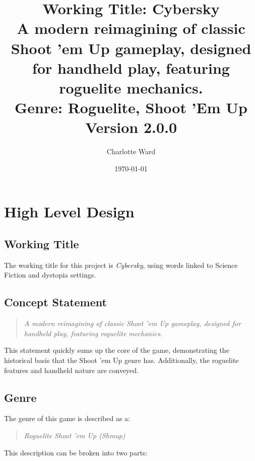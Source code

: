 \documentclass{scrartcl}
\begin{document}
\author{Charlotte Ward}
\date{\today}
\title{
{\huge Working Title: Cybersky} \\
{\small A modern reimagining of classic Shoot 'em Up gameplay, designed for handheld play, featuring roguelite mechanics.} \\
{\small Genre: Roguelite, Shoot 'Em Up} \\
{\small Version 2.0.0}
}
\maketitle

\tableofcontents

\pagebreak

\section{
  High Level Design
 }

\subsection{Working Title}

The working title for this project is \emph{Cybersky}, using words linked to Science Fiction and dystopia settings.

\subsection{Concept Statement}

\begin{quote}
  \emph{A modern reimagining of classic Shoot 'em Up gameplay, designed for handheld play, featuring roguelite mechanics.}
\end{quote}

This statement quickly sums up the core of the game, demonstrating the historical basis that the Shoot 'em Up genre has. Additionally, the roguelite features and handheld nature are conveyed.

\subsection{Genre}

The genre of this game is described as a:

\begin{quote}
  \emph{Roguelite Shoot 'em Up (Shmup)}
\end{quote}

This description can be broken into two parts:
\end{document}
